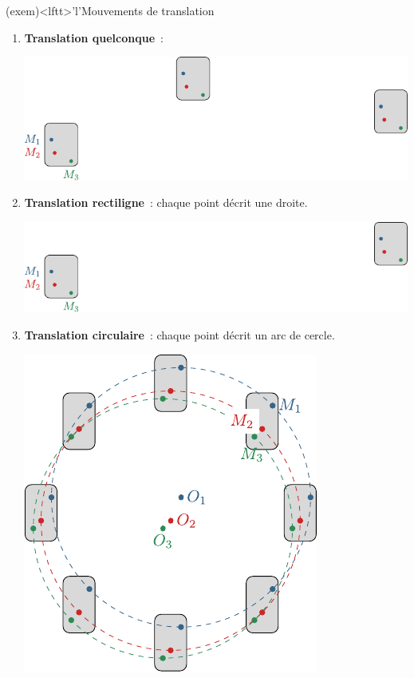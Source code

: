 \documentclass[../../main/main.tex]{subfiles}
\begin{document}
\begin{tcb*}[breakable](exem)<lftt>'l'{Mouvements de translation}
	\begin{enumerate}
		\item \textbf{Translation quelconque}~:
		      \begin{center}
			      \includegraphics[scale=1]{trans_qlcq}
		      \end{center}
		\item \textbf{Translation rectiligne}~: chaque point décrit une droite.
		      \begin{center}
			      \includegraphics[scale=1]{trans_rect}
		      \end{center}
		      \newpage
		\item \textbf{Translation circulaire}~: chaque point décrit un arc de
		      cercle.
		      \begin{center}
			      \includegraphics[scale=1]{trans_circ}
		      \end{center}
	\end{enumerate}
\end{tcb*}
\end{document}
